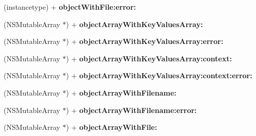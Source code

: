 \begin{DoxyCompactItemize}
(instancetype) + {\bfseries object\+With\+File\+:error\+:}
\item 
\mbox{\label{category_n_s_object_07_m_j_key_value_deprecated__v__2__5__16_08_a355159c4a130b5ed529967a6d453550d}} 
(N\+S\+Mutable\+Array $\ast$) + {\bfseries object\+Array\+With\+Key\+Values\+Array\+:}
\item 
\mbox{\label{category_n_s_object_07_m_j_key_value_deprecated__v__2__5__16_08_af39a9101bc7d689702b6212781cb2333}} 
(N\+S\+Mutable\+Array $\ast$) + {\bfseries object\+Array\+With\+Key\+Values\+Array\+:error\+:}
\item 
\mbox{\label{category_n_s_object_07_m_j_key_value_deprecated__v__2__5__16_08_a01254e02fb32e4a087d24431379cb411}} 
(N\+S\+Mutable\+Array $\ast$) + {\bfseries object\+Array\+With\+Key\+Values\+Array\+:context\+:}
\item 
\mbox{\label{category_n_s_object_07_m_j_key_value_deprecated__v__2__5__16_08_a815a2243e5aa4f0890897d2d6787b224}} 
(N\+S\+Mutable\+Array $\ast$) + {\bfseries object\+Array\+With\+Key\+Values\+Array\+:context\+:error\+:}
\item 
\mbox{\label{category_n_s_object_07_m_j_key_value_deprecated__v__2__5__16_08_a0f8538eb74bd568bc1ef982244c9da59}} 
(N\+S\+Mutable\+Array $\ast$) + {\bfseries object\+Array\+With\+Filename\+:}
\item 
\mbox{\label{category_n_s_object_07_m_j_key_value_deprecated__v__2__5__16_08_acb48249e8e7cddeaaed4e625aaffcef9}} 
(N\+S\+Mutable\+Array $\ast$) + {\bfseries object\+Array\+With\+Filename\+:error\+:}
\item 
\mbox{\label{category_n_s_object_07_m_j_key_value_deprecated__v__2__5__16_08_a298f42e2a31d54414942da520d7ebb40}} 
(N\+S\+Mutable\+Array $\ast$) + {\bfseries object\+Array\+With\+File\+:}
\item 

\end{DoxyCompactItemize}
